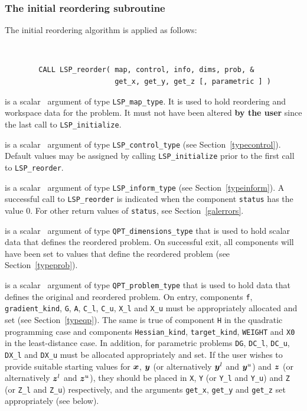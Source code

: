 \documentclass{galahad}
\newcommand{\packagename}{LSP}
\begin{document}
\subsubsection{The initial reordering subroutine}
The initial reordering algorithm is applied as follows: 
\vspace*{-2mm}
{\tt 
\begin{verbatim}
        CALL LSP_reorder( map, control, info, dims, prob, &
                          get_x, get_y, get_z [, parametric ] )
\end{verbatim}
}
\vspace*{-4mm}
\begin{description}
 is a scalar \intentinout\ argument of type 
{\tt \packagename\_map\_type}. 
It is used to hold reordering and workspace data for the problem. 
It must not have been altered {\bf by the user} since the last call
to {\tt \packagename\_initialize}. 
 
 is a scalar \intentin\ argument of type 
{\tt \packagename\_control\_type} 
(see Section~\ref{typecontrol}). 
Default values may be assigned by calling 
{\tt \packagename\_initialize} 
prior to the first call to {\tt \packagename\_reorder}. 
 
 is a scalar \intentout\ argument of type 
{\tt \packagename\_inform\_type} 
(see Section~\ref{typeinform}). 
A successful call to {\tt \packagename\_reor\-der} is indicated 
when the component {\tt status} has the value 0. For other return values 
of {\tt status}, see Section~\ref{galerrors}. 
 
 is a scalar \intentout\ argument of type 
{\tt QPT\_dimensions\_type} that 
is used to hold scalar data that defines the reordered problem. 
On successful exit, all components will have been set to values 
that define the reordered problem (see Section~\ref{typeprob}). 
 
 is a scalar \intentinout\ argument of type 
{\tt QPT\_problem\_type} that 
is used to hold data that defines the original and reordered problem. 
On entry, components {\tt f}, {\tt gradient\_kind}, {\tt G},
{\tt A}, {\tt C\_l}, {\tt C\_u}, {\tt X\_l} and {\tt X\_u} 
must be appropriately allocated and set (see Section~\ref{typeqp}).
The same is true of component {\tt H} in the quadratic programming case
and components {\tt Hessian\_kind}, {\tt target\_kind}, 
{\tt WEIGHT} and {\tt X0} in the least-distance case. 
In addition, for parametric problems
{\tt DG}, {\tt DC\_l}, {\tt DC\_u}, {\tt DX\_l} and {\tt DX\_u}
must be allocated appropriately and set.
If the user wishes to provide suitable starting values for ${\bm{x}}$, ${\bm{y}}$ 
(or alternatively ${\bm{y}}^l$ and ${\bm{y}}^u$) and
${\bm{z}}$ (or alternatively ${\bm{z}}^l$ and ${\bm{z}}^u$), 
they should be placed in {\tt X}, {\tt Y} (or {\tt Y\_l} and {\tt Y\_u})
and {\tt Z} (or {\tt Z\_l} and {\tt Z\_u}) respectively,
and the arguments {\tt get\_x}, {\tt get\_y} and {\tt get\_z}
set appropriately (see below). 


\end{description}
\end{document}
